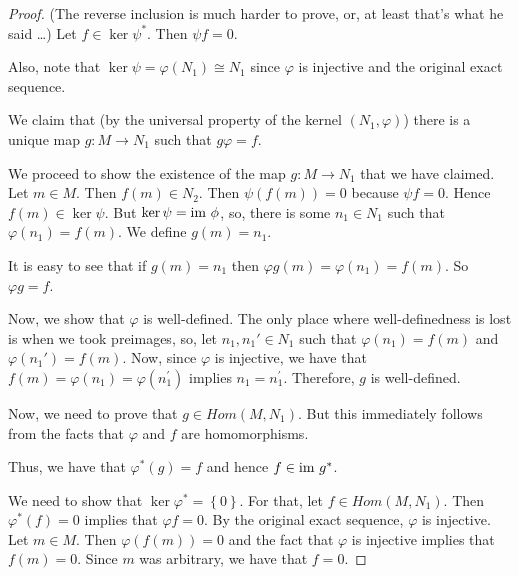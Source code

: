 \begin{proof}
    (The reverse inclusion is much harder to prove, or, at least that's what he said \ldots)
    Let $f\in \ker \psi ^{*}$. Then $\psi f =0$. 

    Also, note that $\ker \psi = \varphi (N_1 ) \cong N_1$ since $\varphi$ is injective and the original exact sequence.

    We claim that (by the universal property of the kernel $\left( N_1 , \varphi \right)$) there is a unique map $g: M \to N_1$ such that $g \varphi =f$.
	\begin{center}
    \end{center}

    We proceed to show the existence of the map $g: M \to N_1$ that we have claimed. Let $m \in M$. Then $f(m) \in N_2$. Then $\psi (f(m))=0$ because $\psi f =0$. Hence $f\left( m \right) \in \ker \psi$. But $\ker \psi = {\text{im }} \phi$, so, there is some $n_1 \in N_1$ such that $\varphi (n_1) = f(m)$. We define $g\left( m \right) = n_1$.

    It is easy to see that if $g(m)=n_1$ then $\varphi g (m ) = \varphi (n_1) = f(m)$. So $\varphi g = f$.

    Now, we show that $\varphi$ is well-defined. The only place where well-definedness is lost is when we took preimages, so, let $n_1 , n_1 ' \in N_1$ such that $\varphi (n_1 ) = f(m)$ and $\varphi (n_1 ' ) = f(m)$. Now, since $\varphi$ is injective, we have that $f(m)=\varphi (n_1) = \varphi (n_1 ^{'})$ implies $n_1 = n_1 ^{'}$. Therefore, $g$ is well-defined.

    Now, we need to prove that $g\in Hom \left( M, N_1 \right)$. But this immediately follows from the facts that $\varphi$ and $f$ are homomorphisms. 

    Thus, we have that $\varphi ^{*} \left( g \right) = f$ and hence $f \in {\text{im }} g^{*}$.

    We need to show that $\ker \varphi ^{*} = \left\{ 0 \right\}$. For that, let $f \in Hom (M, N_1 )$. Then $\varphi ^{*} (f)=0$ implies that $\varphi f =0$. By the original exact sequence, $\varphi$ is injective. Let $m \in M$. Then $\varphi (f(m))=0$ and the fact that $\varphi$ is injective implies that $f(m)=0$. Since $m$ was arbitrary, we have that $f=0$.

\end{proof}
